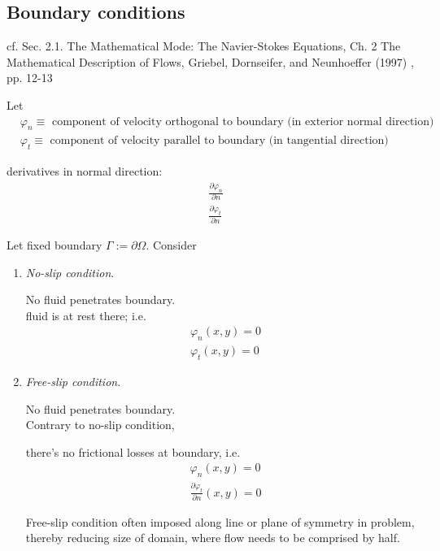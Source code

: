 \documentclass[10pt]{amsart}
\begin{document}
\begin{multicols*}{2}
\subsection{Boundary conditions}

cf. Sec. 2.1. The Mathematical Mode: The Navier-Stokes Equations, Ch. 2 The Mathematical Description of Flows, Griebel, Dornseifer, and Neunhoeffer (1997) \cite{GDN1997}, pp. 12-13

Let
\[
\begin{aligned}
  & \varphi_n \equiv \text{ component of velocity orthogonal to boundary (in exterior normal direction) } \\
  & \varphi_t \equiv \text{ component of velocity parallel to boundary (in tangential direction) } 
\end{aligned}
\]

derivatives in normal direction:
\[
\begin{aligned}
  & \frac{ \partial \varphi_n}{ \partial n } \\ 
  &   \frac{ \partial \varphi_t}{ \partial n } 
  \end{aligned}
\]

Let fixed boundary $\Gamma := \partial \Omega$.  Consider

\begin{enumerate}
\item \emph{No-slip condition}.

  No fluid penetrates boundary.    \\
  fluid is at rest there; i.e.
  \begin{equation}
\begin{aligned}
  & \varphi_n(x,y) = 0 \\
  & \varphi_t(x,y) = 0 
  \end{aligned}
  \end{equation}
\item \emph{Free-slip condition}.

  No fluid penetrates boundary.  \\
  Contrary to no-slip condition,  
  
  there's no frictional losses at boundary, i.e.
  \begin{equation}
\begin{aligned}
  & \varphi_n(x,y) = 0 \\
  & \frac{ \partial \varphi_t}{ \partial n}(x,y) = 0 
  \end{aligned}
  \end{equation}

Free-slip condition often imposed along line or plane of symmetry in problem, thereby reducing size of domain, where flow needs to be comprised by half.  
  

\end{enumerate}
\end{multicols*}
\end{document}

